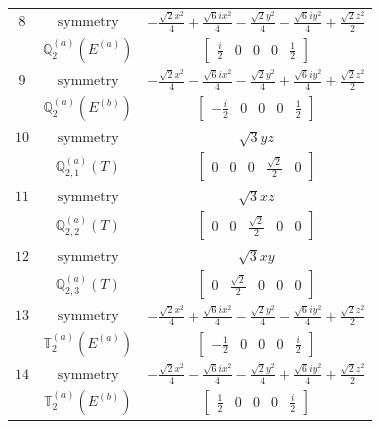 \documentclass[fleqn,8pt,landscape]{jsarticle}
\begin{document}
\begin{longtable}{ccc}
$ 8 $ & $ \text{symmetry} $ & $ - \frac{\sqrt{2} x^{2}}{4} + \frac{\sqrt{6} i x^{2}}{4} - \frac{\sqrt{2} y^{2}}{4} - \frac{\sqrt{6} i y^{2}}{4} + \frac{\sqrt{2} z^{2}}{2} $ \\
$  $ & $ \mathbb{Q}_{2}^{(a)}(E^{(a)}) $ & $ \begin{bmatrix} \frac{i}{2} & 0 & 0 & 0 & \frac{1}{2} \end{bmatrix} $ \\ \hline
$ 9 $ & $ \text{symmetry} $ & $ - \frac{\sqrt{2} x^{2}}{4} - \frac{\sqrt{6} i x^{2}}{4} - \frac{\sqrt{2} y^{2}}{4} + \frac{\sqrt{6} i y^{2}}{4} + \frac{\sqrt{2} z^{2}}{2} $ \\
$  $ & $ \mathbb{Q}_{2}^{(a)}(E^{(b)}) $ & $ \begin{bmatrix} - \frac{i}{2} & 0 & 0 & 0 & \frac{1}{2} \end{bmatrix} $ \\ \hline
$ 10 $ & $ \text{symmetry} $ & $ \sqrt{3} y z $ \\
$  $ & $ \mathbb{Q}_{2,1}^{(a)}(T) $ & $ \begin{bmatrix} 0 & 0 & 0 & \frac{\sqrt{2}}{2} & 0 \end{bmatrix} $ \\ \hline
$ 11 $ & $ \text{symmetry} $ & $ \sqrt{3} x z $ \\
$  $ & $ \mathbb{Q}_{2,2}^{(a)}(T) $ & $ \begin{bmatrix} 0 & 0 & \frac{\sqrt{2}}{2} & 0 & 0 \end{bmatrix} $ \\ \hline
$ 12 $ & $ \text{symmetry} $ & $ \sqrt{3} x y $ \\
$  $ & $ \mathbb{Q}_{2,3}^{(a)}(T) $ & $ \begin{bmatrix} 0 & \frac{\sqrt{2}}{2} & 0 & 0 & 0 \end{bmatrix} $ \\ \hline
$ 13 $ & $ \text{symmetry} $ & $ - \frac{\sqrt{2} x^{2}}{4} + \frac{\sqrt{6} i x^{2}}{4} - \frac{\sqrt{2} y^{2}}{4} - \frac{\sqrt{6} i y^{2}}{4} + \frac{\sqrt{2} z^{2}}{2} $ \\
$  $ & $ \mathbb{T}_{2}^{(a)}(E^{(a)}) $ & $ \begin{bmatrix} - \frac{1}{2} & 0 & 0 & 0 & \frac{i}{2} \end{bmatrix} $ \\ \hline
$ 14 $ & $ \text{symmetry} $ & $ - \frac{\sqrt{2} x^{2}}{4} - \frac{\sqrt{6} i x^{2}}{4} - \frac{\sqrt{2} y^{2}}{4} + \frac{\sqrt{6} i y^{2}}{4} + \frac{\sqrt{2} z^{2}}{2} $ \\
$  $ & $ \mathbb{T}_{2}^{(a)}(E^{(b)}) $ & $ \begin{bmatrix} \frac{1}{2} & 0 & 0 & 0 & \frac{i}{2} \end{bmatrix} $ \\ \hline

\end{longtable}
\end{document}
